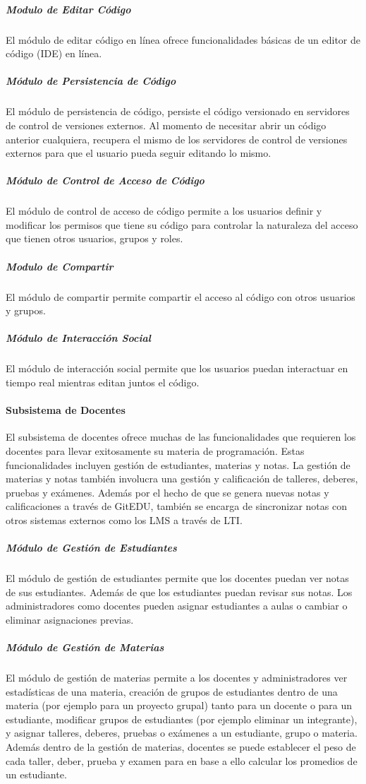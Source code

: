 \subparagraph{Modulo de Editar Código}
El módulo de editar código en línea ofrece funcionalidades básicas de un editor de código (IDE) en línea.

\subparagraph{Módulo de Persistencia de Código}
El módulo de persistencia de código, persiste el código versionado en servidores de control de versiones externos. Al momento de necesitar abrir un código anterior cualquiera, recupera el mismo de los servidores de control de versiones externos para que el usuario pueda seguir editando lo mismo.

\subparagraph{Módulo de Control de Acceso de Código}
El módulo de control de acceso de código permite a los usuarios definir y modificar los permisos que tiene su código para controlar la naturaleza del acceso que tienen otros usuarios, grupos y roles.

\subparagraph{Modulo de Compartir}
El módulo de compartir permite compartir el acceso al código con otros usuarios y grupos.

\subparagraph{Módulo de Interacción Social}
El módulo de interacción social permite que los usuarios puedan interactuar en tiempo real mientras editan juntos el código.

\paragraph{Subsistema de Docentes}
El subsistema de docentes ofrece muchas de las funcionalidades que requieren los docentes para llevar exitosamente su materia de programación. Estas funcionalidades incluyen gestión de estudiantes, materias y notas. La gestión de materias y notas también involucra una gestión y calificación de talleres, deberes, pruebas y exámenes. Además por el hecho de que se genera nuevas notas y calificaciones a través de GitEDU, también se encarga de sincronizar notas con otros sistemas externos como los LMS  a través de LTI.

\subparagraph{Módulo de Gestión de Estudiantes}
El módulo de gestión de estudiantes permite que los docentes puedan ver notas de sus estudiantes. Además de que los estudiantes puedan revisar sus notas. Los administradores como docentes pueden asignar estudiantes a aulas o cambiar o eliminar asignaciones previas.

\subparagraph{Módulo de Gestión de Materias}
El módulo de gestión de materias permite a los docentes y administradores ver estadísticas de una materia, creación de grupos de estudiantes dentro de una materia (por ejemplo para un proyecto grupal) tanto para un docente o para un estudiante, modificar grupos de estudiantes (por ejemplo eliminar un integrante), y asignar talleres, deberes, pruebas o exámenes a un estudiante, grupo o materia. Además dentro de la gestión de materias, docentes se puede establecer el peso de cada taller, deber, prueba y examen para en base a ello calcular los promedios de un estudiante.

